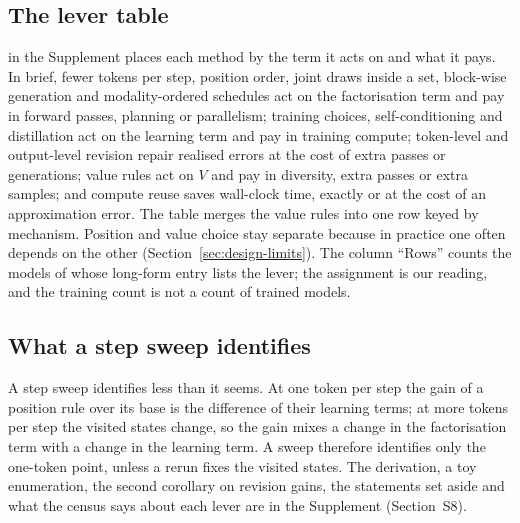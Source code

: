 \subsection{The lever table}
\label{sec:budget-levers}

\suppTabLevers{} in the Supplement places each method by the term it acts on and what it pays. In brief, fewer tokens per step, position order, joint draws inside a set, block-wise generation and modality-ordered schedules act on the factorisation term and pay in forward passes, planning or parallelism; training choices, self-conditioning and distillation act on the learning term and pay in training compute; token-level and output-level revision repair realised errors at the cost of extra passes or generations; value rules act on $V$ and pay in diversity, extra passes or extra samples; and compute reuse saves wall-clock time, exactly or at the cost of an approximation error. The table merges the value rules into one row keyed by mechanism. Position and value choice stay separate because in practice one often depends on the other (Section~\ref{sec:design-limits}). The column ``Rows'' counts the models of \suppTabDesign{} whose long-form entry lists the lever; the assignment is our reading, and the training count is not a count of trained models. %


\subsection{What a step sweep identifies}
\label{sec:budget-props}

A step sweep identifies less than it seems. At one token per step the gain of a position rule over its base is the difference of their learning terms; at more tokens per step the visited states change, so the gain mixes a change in the factorisation term with a change in the learning term. A sweep therefore identifies only the one-token point, unless a rerun fixes the visited states. The derivation, a toy enumeration, the second corollary on revision gains, the statements set aside and what the census says about each lever are in the Supplement (Section~S8).
